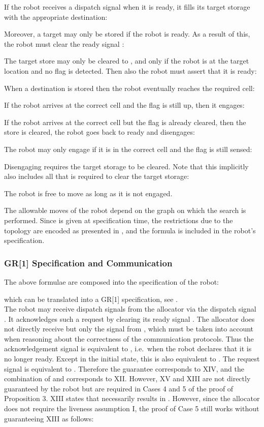 If the robot receives a dispatch signal when it is ready, it fills its target storage with the appropriate destination:

Moreover, a target may only be stored if the robot is ready. As a result of this, the robot must clear the ready signal :

The target store may only be cleared to , and only if the robot is at the target location and no flag is detected. Then also the robot must assert that it is ready:


When a destination is stored then the robot eventually reaches the required cell:


If the robot arrives at the correct cell and the flag is still up, then it engages:

If the robot arrives at the correct cell but the flag is already cleared, then the store is cleared, the robot goes back to ready and disengages:

The robot may only engage if it is in the correct cell and the flag is still sensed:

Disengaging requires the target storage to be cleared. Note that this implicitly also includes all that is required to clear the target storage:


The robot is free to move as long as it is not engaged.


The allowable moves of the robot depend on the graph  on which the search is performed. Since  is given at specification time, the restrictions due to the topology are encoded as presented in , and the formula  is included in the robot's specification.\\


\subsubsection{GR[1] Specification and Communication}  

The above formulae are composed into the specification of the robot:

which can be translated into a GR[1] specification, see .\\

The robot  may receive dispatch signals from the allocator via the dispatch signal . It acknowledges such a request by clearing its ready signal . The allocator does not directly receive  but only the signal  from , which must be taken into account when reasoning about the correctness of the communication protocols. Thus the acknowledgement signal is equivalent to , i.e.\ when the robot declares that it is no longer ready. Except in the initial state, this is also equivalent to . The request signal is equivalent to . Therefore the guarantee  corresponds to XIV, and the combination of  and  corresponds to XII. However, XV and XIII are not directly guaranteed by the robot but are required in Cases 4 and 5 of the proof of Proposition 3. XIII states that  necessarily results in . However, since the allocator does not require the liveness assumption I, the proof of Case 5 still works without guaranteeing XIII as follows:\\

